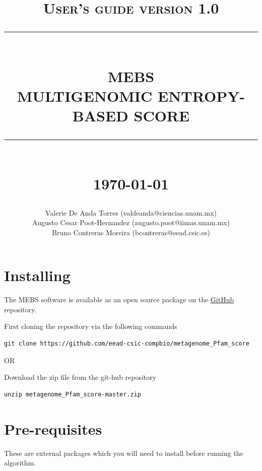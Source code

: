 \documentclass[12pt]{report}
\newcommand{\HRule}[1]{\rule{\linewidth}{#1}}
\begin{document}
\title{ \normalsize \textsc{User's guide version 1.0}
		\\ [2.0cm]
		\HRule{0.5pt} \\
		\LARGE \textbf{\uppercase{MEBS}}\\
  \textbf{\uppercase{Multigenomic Entropy-Based Score}}      
		\HRule{2pt} \\ [0.5cm]
		\normalsize \today \vspace*{5\baselineskip}}

\date{}

\author{
		Valerie De Anda Torres (valdeanda@ciencias.unam.mx) \\ 
    Augusto Cesar Poot-Hernandez (augusto.poot@iimas.unam.mx) \\
		Bruno Contreras Moreira (bcontreras@eead.csic.es) }

\maketitle
\tableofcontents
\newpage

\sectionfont{\scshape}
\section{Installing}
The MEBS software is available as an open source package on the
\href{https://github.com/eead-csic-compbio/metagenome_Pfam_score}{GitHub}
repository.

First cloning the repository via the following commands

\begin{verbatim}
git clone https://github.com/eead-csic-compbio/metagenome_Pfam_score
\end{verbatim}
       
       OR 

Download the zip file from the git-hub repository 

\begin{verbatim}
unzip metagenome_Pfam_score-master.zip
\end{verbatim}

\section{Pre-requisites}
These are external packages which you will need to install before running the
algorithm. 
\end{document}
